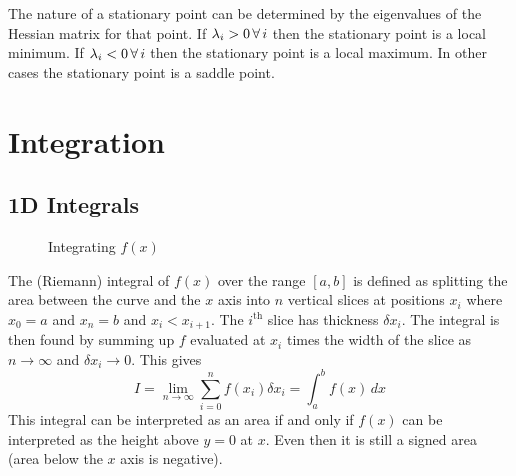 \documentclass{article}
\begin{document}
    The nature of a stationary point can be determined by the eigenvalues of the Hessian matrix for that point.
    If \(\lambda_i>0\,\forall\, i\) then the stationary point is a local minimum.
    If \(\lambda_i<0\,\forall\, i\) then the stationary point is a local maximum.
    In other cases the stationary point is a saddle point.
    
    \section{Integration}
    \subsection{1D Integrals}
    \begin{figure}[ht]
        \centering
        \caption{Integrating \(f(x)\)}
    \end{figure}
    The (Riemann) integral of \(f(x)\) over the range \([a, b]\) is defined as splitting the area between the curve and the \(x\) axis into \(n\) vertical slices at positions \(x_i\) where \(x_0 = a\) and \(x_n = b\) and \(x_i < x_{i+1}\).
    The \(i^\text{th}\) slice has thickness \(\delta x_i\).
    The integral is then found by summing up \(f\) evaluated at \(x_i\) times the width of the slice as \(n\to \infty\) and \(\delta x_i\to 0\).
    This gives
    \[I = \lim_{n\to \infty}\sum_{i = 0}^{n} f(x_i)\delta x_i = \int_a^b f(x)\,dx\]
    This integral can be interpreted as an area if and only if \(f(x)\) can be interpreted as the height above \(y = 0\) at \(x\).
    Even then it is still a signed area (area below the \(x\) axis is negative).
    
\end{document}
